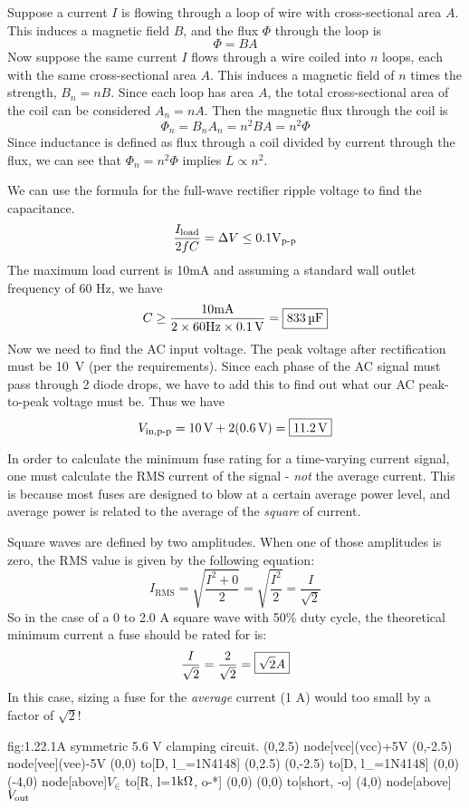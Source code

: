Suppose a current \(I\) is flowing through a loop of wire with cross-sectional area \(A\).
This induces a magnetic field \(B\), and the flux \(\Phi\) through the loop is
\[\Phi = BA\]
Now suppose the same current \(I\) flows through a wire coiled into \(n\) loops, each with the same cross-sectional area \(A\).
This induces a magnetic field of \(n\) times the strength, \(B_n = nB\). Since each loop has area \(A\),
the total cross-sectional area of the coil can be considered \(A_n = nA\). Then the magnetic flux
through the coil is
\[\Phi_n = B_nA_n = n^2BA = n^2\Phi\]
Since inductance is defined as flux through a coil divided by current through the flux,
we can see that \(\Phi_n = n^2\Phi\) implies \(L \propto n^2\).

We can use the formula for the full-wave rectifier ripple voltage to find the capacitance.
\[\frac{I_{\text{load}}}{2fC} = \Delta V \le 0.1 \text{V}_{\text{p-p}}\]
The maximum load current is 10mA and assuming a standard wall outlet frequency of 60 Hz, we have
\[C \ge \frac{10\m\A}{2\times 60\Hz \times \SI{0.1}{\V}} = \mans{\SI{833}{\micro\farad}}\]
Now we need to find the AC input voltage. The peak voltage after rectification must be \SI{10}{\V} (per the requirements). Since each phase of the AC signal must pass through 2 diode drops, we have to add this to find out what our AC peak-to-peak voltage must be. Thus we have
\[V_{\in, \pp} = \SI{10}{\V} + 2(\SI{0.6}{\V}) = \mans{\SI{11.2}{\V}}\]

In order to calculate the minimum fuse rating for a time-varying current signal, one must calculate the RMS current of the signal - \emph{not} the average current.  This is because most fuses are designed to blow at a certain average power level, and average power is related to the average of the \textit{square} of current.

Square waves are defined by two amplitudes.  When one of those amplitudes is zero, the RMS value is given by the following equation:
\[ I_{\text{RMS}} = \sqrt{\frac{I^2 + 0}{2}} = \sqrt{\frac{I^2}{2}} = \frac{I}{\sqrt{2}}\]
So in the case of a 0 to 2.0 A square wave with 50\% duty cycle, the theoretical minimum current a fuse should be rated for is:
\[\frac{I}{\sqrt{2}} = \frac{2}{\sqrt{2}} = \boxed{\sqrt{2} A}\]
In this case, sizing a fuse for the \textit{average} current (1 A) would too small by a factor of $\sqrt{2}$!

\begin{circuit}{fig:1.22.1}{A symmetric 5.6 V clamping circuit.}
    (0,2.5) node[vcc](vcc){+5V}
    (0,-2.5) node[vee](vee){-5V}
    (0,0) to[D, l_=1N4148] (0,2.5)
    (0,-2.5) to[D, l_=1N4148] (0,0)
    (-4,0) node[above]{$V_\in$} to[R, l=$1\text{k}\Omega$, o-*] (0,0)
    (0,0) to[short, -o] (4,0) node[above]{$V_{\text{out}}$}
\end{circuit}

